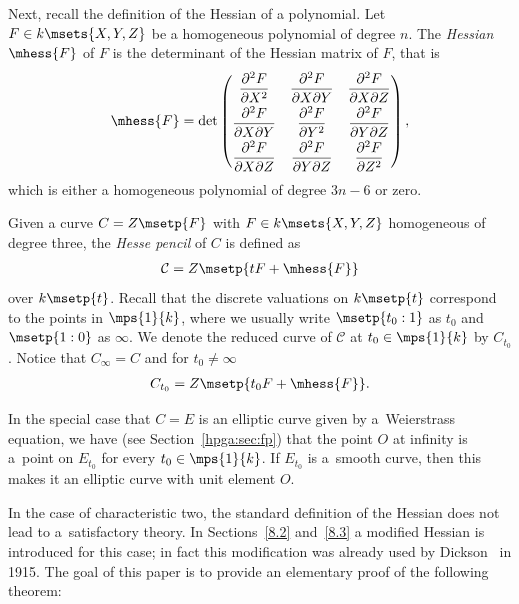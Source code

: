 Next, recall the definition of the Hessian of a polynomial. Let $F\in k\msets {X,Y,Z}$ be a homogeneous polynomial of degree $n$. The \emph{Hessian} $\mhess{F}$ of $F$ is the determinant of the Hessian matrix of $F$, that is
\begin{gather*}
\mhess{F}=\det
\begin{pmatrix}
\dfrac{\partial^2 F}{\partial X^2} & \dfrac{\partial^2 F}{\partial X \partial Y} & \dfrac{\partial^2 F}{\partial X \partial Z} \vspace{1mm}\\
\dfrac{\partial^2 F}{\partial X \partial Y} & \dfrac{\partial^2 F}{\partial Y^2} & \dfrac{\partial^2 F}{\partial Y \partial Z} \vspace{1mm}\\
\dfrac{\partial^2 F}{\partial X \partial Z} & \dfrac{\partial^2 F}{\partial Y \partial Z} & \dfrac{\partial^2 F}{\partial Z^2}
\end{pmatrix},
\end{gather*}
which is either a homogeneous polynomial of degree $3n-6$ or zero.

Given a curve $C=Z\msetp{F}$ with $F\in k\msets{X,Y,Z}$ homogeneous of degree three, the \emph{Hesse pencil} of $C$ is defined as
\begin{gather*}
\mathcal{C}=Z\msetp{tF+\mhess{F}}
\end{gather*}
over $k\msetp{t}$. Recall that the discrete valuations on $k\msetp{t}$ correspond to the points in $\mps{1}{k}$, where we usually write $\msetp{t_0:1}$ as $t_0$ and $\msetp{1:0}$ as $\infty$. We denote the reduced curve of $\mathcal {C}$ at $t_0\in\mps{1}{k}$ by $C_{t_0}$. Notice that $C_\infty=C$ and for $t_0 \neq\infty$
\begin{gather*}
C_{t_0}=Z\msetp{t_0F+\mhess{F}}.
\end{gather*}

In the special case that $C=E$ is an elliptic curve given by a~Weierstrass equation, we have (see Section~\ref{hpga:sec:fp}) that the point $O$ at infinity is a~point on $E_{t_0}$ for every $t_0\in\mps{1}{k}$. If $E_{t_0}$ is a~smooth curve, then this makes it an elliptic curve with unit element $O$.

In the case of characteristic two, the standard definition of the Hessian does not lead to a~satisfactory theory. In Sections~\ref{8.2} and~\ref{8.3} a modified Hessian is introduced for this case; in fact this modification was already used by Dickson~\cite{Dickson} in 1915. The goal of this paper is to provide an elementary proof of the following theorem:

